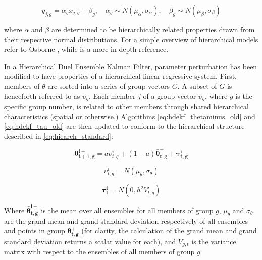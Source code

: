 \begin{equation}\label{eq:hiearch_standard}
y_{j,g} = \alpha_{g} x_{j,g} + \beta_{g}, \quad \alpha_{g} \sim N( \mu_{\alpha}, \sigma_{\alpha} ), \quad \beta_{g} \sim N( \mu_{\beta} , \sigma_{\beta} )
\end{equation}

where $\alpha$ and $\beta$ are determined to be hierarchically related properties drawn from their respective normal distributions. For a simple overview of hierarchical models refer to Osborne \cite{Osborne2000}, while \cite{Gelman2013} is a more in-depth reference.

In a Hierarchical Duel Ensemble Kalman Filter, parameter perturbation has been modified to have properties of a hierarchical linear regressive system. First, members of $\theta$ are sorted into a series of group vectors $G$. A subset of $G$ is henceforth referred to as $\upsilon_g$. Each member $j$ of a group vector $\upsilon_g$, where $g$ is the specific group number, is related to other members through shared hierarchical characteristics (spatial or otherwise.) Algorithms \eqref{eq:hdekf_thetaminus_old} and \eqref{eq:hdekf_tau_old} are then updated to conform to the hierarchical structure described in \eqref{eq:hiearch_standard}:

\begin{equation}\label{eq:hdekf_theta}
\mathbf{\theta_{t+1,g}^{i-}} = a \upsilon_{t,g}^{i} + (1-a)\mathbf{\bar{\theta}_{t,g}^{+}} + \mathbf{\tau_{t,g}^{i}}
\end{equation}


\begin{equation}\label{eq:hdekf_tau}
\upsilon_{t,g}^{i} = N( \mu_{\theta}, \sigma_{\theta} )
\end{equation}

\begin{equation}\label{eq:hdekf_tau}
\mathbf{\tau_{t}^{i}} = N(0, h^{2}V_{t,g}^{i})
\end{equation}


Where $\mathbf{\bar{\theta}_{t,g}^{i+}}$ is the mean over all ensembles for all members of group $g$, $\mu_{\theta}$ and $\sigma_{\theta}$ are the grand mean and grand standard deviation respectively of all ensembles and points in group $\mathbf{\theta_{t,g}^{+}}$ (for clarity, the calculation of the grand mean and grand standard deviation returns a scalar value for each), and $V_{g,t}$ is the variance matrix with respect to the ensembles of all members of group $g$.

